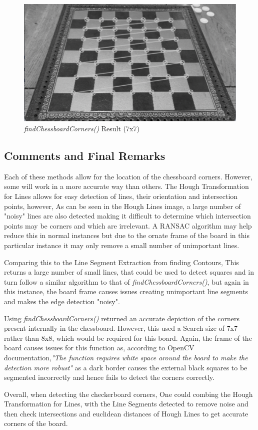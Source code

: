 \documentclass[12pt]{article}
\begin{document}
    \begin{figure}
        \centering
        \includegraphics[scale=0.25]{findChessboardCorners.png}
        \caption{\emph{findChessboardCorners()} Result (7x7)}
    \end{figure}

    \subsection{Comments and Final Remarks}
    \par
    Each of these methods allow for the location of the chessboard corners. However, some will work in a more accurate way than others. The Hough Transformation for Lines allows for easy detection of lines, their orientation and intersection points, however, As can be seen in the Hough Lines image, a large number of "noisy" lines 
    are also detected making it difficult to determine which intersection points may be corners and which are irrelevant. A RANSAC algorithm may help reduce this in normal instances but due to the ornate frame of the board in this particular instance it may only remove a small number of unimportant lines. 
    \par
    Comparing this to the Line Segment Extraction from finding Contours, This returns a large number of small lines, that could be used to detect squares and in turn follow a similar algorithm to that of \emph{findChessboardCorners()}, but again in this instance, the board frame causes issues creating unimportant line segments and makes
    the edge detection "noisy". 
    \par
    Using \emph{findChessboardCorners()} returned an accurate depiction of the corners present internally in the chessboard. However, this used a Search size of 7x7 rather than 8x8, which would be required for this board. Again, the frame of the board causes issues for this function as, according to OpenCV documentation,\emph{"The function requires white space
    around the board to make the detection more robust"} as a dark border causes the external black squares to be segmented incorrectly and hence fails to detect the corners correctly.
    \par
    Overall, when detecting the checkerboard corners, One could combing the Hough Transformation for Lines, with the Line Segments detected to remove noise and then check intersections and euclidean distances of Hough Lines to get accurate 
    corners of the board.
\end{document}
